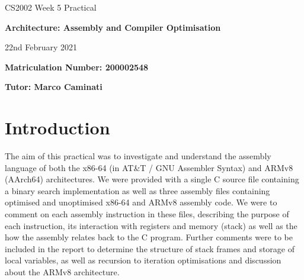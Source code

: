 \documentclass{article}
\begin{document}
\nocite{*}

\begin{center}
\Huge 
CS2002 Week 5 Practical

\vspace{0.5cm}

\textbf{Architecture: Assembly and Compiler Optimisation}

\vspace{1cm}
\LARGE
22nd February 2021

\large
\vspace{1.5cm}

\textbf{Matriculation Number: 200002548}

\vspace{0.5cm}

\textbf{Tutor: Marco Caminati}

\end{center}

\vspace*{3cm}	

\tableofcontents

\newpage
\section{Introduction}
The aim of this practical was to investigate and understand the assembly language of both the x86-64 (in AT\&T / GNU Assembler Syntax) and ARMv8 (AArch64) architectures. We were provided with a single C source file containing a binary search implementation as well as three assembly files containing optimised and unoptimised x86-64 and ARMv8 assembly code. We were to comment on each assembly instruction in these files, describing the purpose of each instruction, its interaction with registers and memory (stack) as well as the how the assembly relates back to the C program. Further comments were to be included in the report to determine the structure of stack frames and storage of local variables, as well as recursion to iteration optimisations and discussion about the ARMv8 architecture.
\end{document}
